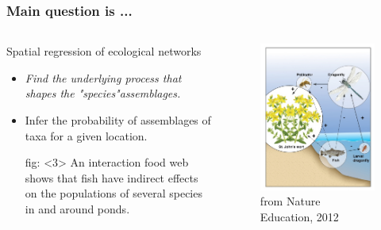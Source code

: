 \documentclass{beamer}
\begin{document}
	\begin{frame}
		\frametitle{Main question is ...}

				\begin{columns}
					\begin{column}{0.4\textwidth}
						\begin{alertblock}{Spatial regression of ecological networks}						
						\begin{itemize}
						\item<1> {\em Find the underlying process that shapes the "species"assemblages.}
						\item<2> Infer the probability of assemblages of taxa for a given location.
						\item[fig:]<3> {\small An interaction food web shows that fish have indirect effects on the populations of several species in and around ponds. }
						\end{itemize}										
					    \end{alertblock}		
					\end{column}
				
			\begin{column}{0.5\textwidth}
			\begin{figure}						
			\centering
		    \includegraphics[scale=0.4]{foodweb2.jpg}		
		    \caption{{\small from Nature Education, 2012}}			
			\end{figure}
		    \end{column}    	    
		\end{columns}
	\end{frame}
\end{document}
